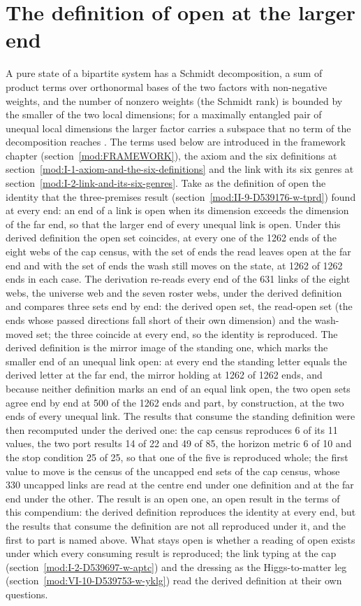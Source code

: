 \section{The definition of open at the larger end}\label{mod:I-1-D539391-w-dole}
A pure state of a bipartite system has a Schmidt decomposition, a sum of product terms over orthonormal bases of the two factors with non-negative weights, and the number of nonzero weights (the Schmidt rank) is bounded by the smaller of the two local dimensions; for a maximally entangled pair of unequal local dimensions the larger factor carries a subspace that no term of the decomposition reaches \cite{Schmidt1907,Nielsen2000}. The terms used below are introduced in the framework chapter (section~\ref{mod:FRAMEWORK}), the axiom and the six definitions at section~\ref{mod:I-1-axiom-and-the-six-definitions} and the link with its six genres at section~\ref{mod:I-2-link-and-its-six-genres}.
Take as the definition of open the identity that the three-premises result (section~\ref{mod:II-9-D539176-w-tprd}) found at every end: an end of a link is open when its dimension exceeds the dimension of the far end, so that the larger end of every unequal link is open. Under this derived definition the open set coincides, at every one of the 1262 ends of the eight webs of the cap census, with the set of ends the read leaves open at the far end and with the set of ends the wash still moves on the state, at 1262 of 1262 ends in each case.
The derivation re-reads every end of the 631 links of the eight webs, the universe web and the seven roster webs, under the derived definition and compares three sets end by end: the derived open set, the read-open set (the ends whose passed directions fall short of their own dimension) and the wash-moved set; the three coincide at every end, so the identity is reproduced. The derived definition is the mirror image of the standing one, which marks the smaller end of an unequal link open: at every end the standing letter equals the derived letter at the far end, the mirror holding at 1262 of 1262 ends, and because neither definition marks an end of an equal link open, the two open sets agree end by end at 500 of the 1262 ends and part, by construction, at the two ends of every unequal link. The results that consume the standing definition were then recomputed under the derived one: the cap census reproduces 6 of its 11 values, the two port results 14 of 22 and 49 of 85, the horizon metric 6 of 10 and the stop condition 25 of 25, so that one of the five is reproduced whole; the first value to move is the census of the uncapped end sets of the cap census, whose 330 uncapped links are read at the centre end under one definition and at the far end under the other.
The result is an open one, an open result in the terms of this compendium: the derived definition reproduces the identity at every end, but the results that consume the definition are not all reproduced under it, and the first to part is named above.
What stays open is whether a reading of open exists under which every consuming result is reproduced; the link typing at the cap (section~\ref{mod:I-2-D539697-w-aptc}) and the dressing as the Higgs-to-matter leg (section~\ref{mod:VI-10-D539753-w-yklg}) read the derived definition at their own questions.
